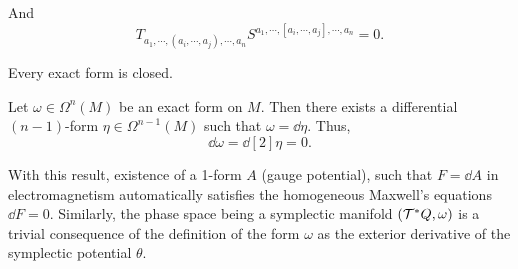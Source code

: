And
\begin{equation*}
    T_{a_1, \cdots, (a_i, \cdots, a_j), \cdots, a_n} S^{a_1, \cdots, [a_i, \cdots, a_j], \cdots, a_n} = 0.
\end{equation*}
\begin{corollary}
    Every exact form is closed.
\end{corollary}
\begin{Proof}
    Let \(\omega \in \Omega^n(M)\) be an exact form on \(M\). Then there exists a differential \((n-1)\)-form \(\eta \in \Omega^{n-1}(M)\) such that \(\omega = \dd{\eta}\). Thus,
    \begin{equation*}
        \dd{\omega} = \dd[2]{\eta} = 0.
    \end{equation*}
\end{Proof}
With this result, existence of a 1-form \(A\) (gauge potential), such that \(F = \dd{A}\) in electromagnetism automatically satisfies the homogeneous Maxwell's equations \(\dd{F} = 0\). Similarly, the phase space being a symplectic manifold \((\mathcal T^* Q, \omega)\) is a trivial consequence of the definition of the form \(\omega\) as the exterior derivative of the symplectic potential \(\theta\).


